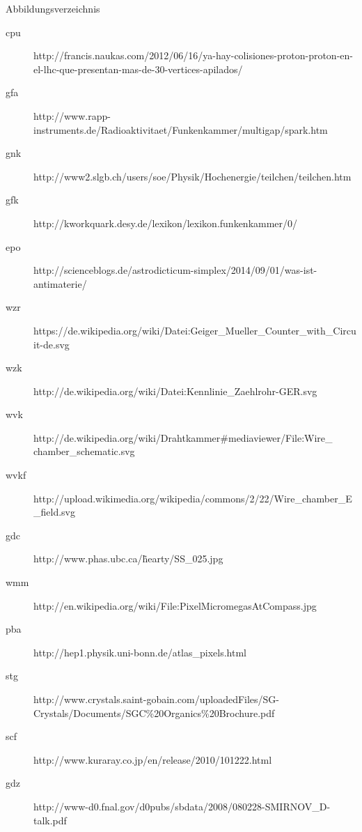 \documentclass{beamer}
\begin{document}
\begin{frame}{Abbildungsverzeichnis}
\footnotesize
	\begin{adjustwidth}{-5em}{-2em}
	  	\begin{description}
	  		\item[cpu]
		  	http://francis.naukas.com/2012/06/16/ya-hay-colisiones-proton-proton-en-el-lhc-que-presentan-mas-de-30-vertices-apilados/
			\item[gfa]
		  	http://www.rapp-instruments.de/Radioaktivitaet/Funkenkammer/multigap/spark.htm	
		  	\item[gnk]
		  	http://www2.slgb.ch/users/soe/Physik/Hochenergie/teilchen/teilchen.htm  
		  	\item[gfk]
		  	http://kworkquark.desy.de/lexikon/lexikon.funkenkammer/0/
		  	\item[epo]
		  	http://scienceblogs.de/astrodicticum-simplex/2014/09/01/was-ist-antimaterie/
		 	\item[wzr]
		  	https://de.wikipedia.org/wiki/Datei:Geiger\_Mueller\_Counter\_with\_Circuit-de.svg
		  	\item[wzk]
			http://de.wikipedia.org/wiki/Datei:Kennlinie\_Zaehlrohr-GER.svg
			\item[wvk]
		  	http://de.wikipedia.org/wiki/Drahtkammer\#mediaviewer/File:Wire\_ chamber\_schematic.svg
		  	\item[wvkf]
		  	http://upload.wikimedia.org/wikipedia/commons/2/22/Wire\_chamber\_E\_field.svg
		  	\item[gdc]
		  	http://www.phas.ubc.ca/\~hearty/SS\_025.jpg
		  	\item[wmm]
		  	http://en.wikipedia.org/wiki/File:PixelMicromegasAtCompass.jpg
		  	\item[pba]
		  	http://hep1.physik.uni-bonn.de/atlas\_pixels.html
		  	\item[stg]
		  	http://www.crystals.saint-gobain.com/uploadedFiles/SG-Crystals/Documents/SGC\%20Organics\%20Brochure.pdf
		  	\item[scf]
		  	http://www.kuraray.co.jp/en/release/2010/101222.html
			\item[gdz]
		  	http://www-d0.fnal.gov/d0pubs/sbdata/2008/080228-SMIRNOV\_D-talk.pdf
		  	
		\end{description}
	\end{adjustwidth}
\end{frame}
\end{document}
